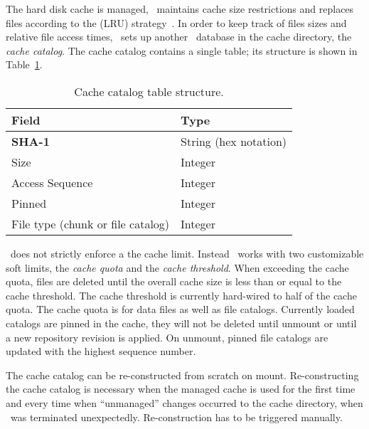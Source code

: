 The hard disk cache is managed, \ie \cvmfs\ maintains cache size restrictions and replaces files according to the  (LRU) strategy~\cite{lru06}.
In order to keep track of files sizes and relative file access times, \cvmfs\ sets up another \sqlite\ database in the cache directory, the \emph{cache catalog}.
The cache catalog contains a single table; its structure is shown in Table~\ref{tab:cachecatalog}.
\begin{table}
	\begin{center}
		\begin{tabular}{ll}
			\toprule
			\bf Field 							& \bf Type \\
			\midrule
			\bf SHA-1 							& String (hex notation) \\
			Size 								& Integer \\
			Access Sequence						& Integer \\
			Pinned								& Integer \\
			File type (chunk or file catalog)	& Integer\\
			\bottomrule
		\end{tabular}
	\end{center}
	\caption{Cache catalog table structure.}
	\label{tab:cachecatalog}
\end{table}

\cvmfs\ does not strictly enforce a the cache limit.
Instead \cvmfs\ works with two customizable soft limits, the \emph{cache quota} and the \emph{cache threshold}.
When exceeding the cache quota, files are deleted until the overall cache size is less than or equal to the cache threshold.
The cache threshold is currently hard-wired to half of the cache quota.
The cache quota is for data files as well as file catalogs.
Currently loaded catalogs are pinned in the cache, \ie they will not be deleted until unmount or until a new repository revision is applied.
On unmount, pinned file catalogs are updated with the highest sequence number.

The cache catalog can be re-constructed from scratch on mount.
Re-constructing the cache catalog is necessary when the managed cache is used for the first time and every time when ``unmanaged'' changes occurred to the cache directory, \eg when \cvmfs\ was terminated unexpectedly.
Re-construction has to be triggered manually.

